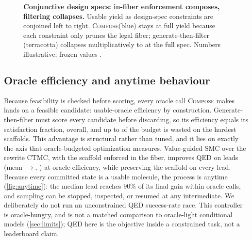 \documentclass{article}
\newcommand{\method}{\textsc{Compose}\xspace}
\theoremstyle{definition}
\theoremstyle{remark}
\begin{document}
\begin{figure}[t]
\centering
{}
\caption{\textbf{Conjunctive design specs: in-fiber enforcement composes, filtering collapses.} Usable yield as design-spec constraints are conjoined left to right. \method (blue) stays at full yield because each constraint only prunes the legal fiber; generate-then-filter (terracotta) collapses multiplicatively to \ConjunctionFullSpec{} at the full spec. Numbers illustrative; frozen values \XXX.}
\label{fig:conjunction}
\end{figure}

\subsection{Oracle efficiency and anytime behaviour}
\label{sec:oracle}

Because feasibility is checked before scoring, every oracle call \method makes lands on a feasible candidate: \ComposeOracleEfficiency{} usable-oracle efficiency by construction. Generate-then-filter must score every candidate before discarding, so its efficiency equals its satisfaction fraction, \ComposeBaselineOracleEfficiency{} overall, and up to \ComposeBaselineOracleWastedHard{} of the budget is wasted on the hardest scaffolds. This advantage is structural rather than tuned, and it lies on exactly the axis that oracle-budgeted optimization measures. Value-guided SMC over the rewrite CTMC, with the scaffold enforced in the fiber, improves QED on \ComposeConstrainedLeadsImproved{} leads (mean \ComposeConstrainedQEDFrom{}$\to$\ComposeConstrainedQEDTo{}, \ComposeConstrainedQEDGain{}) at \ComposeOracleEfficiency{} oracle efficiency, while preserving the scaffold on every lead. Because every committed state is a usable molecule, the process is anytime (\cref{fig:anytime}): the median lead reaches $90\%$ of its final gain within \ComposeAnytimeCalls{} oracle calls, and sampling can be stopped, inspected, or resumed at any intermediate. We deliberately do not run an unconstrained QED success-rate race. This controller is oracle-hungry, and is not a matched comparison to oracle-light conditional models (\cref{sec:limits}); QED here is the objective inside a constrained task, not a leaderboard claim.
\end{document}
